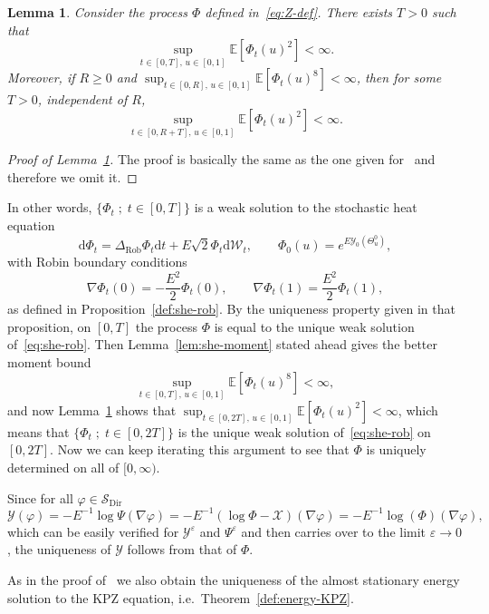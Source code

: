 \documentclass[10pt]{amsart}
\newtheorem{lemm}[theo]{Lemma}\newtheorem{prop}[theo]{Proposition}\newtheorem{coro}[theo]{Corollary}\newtheorem{conj}[theo]{Conjecture}
\theoremstyle{definition}\newtheorem{defi}[theo]{Definition}\newtheorem{rema}[theo]{Remark}\newtheorem{exam}[theo]{Example}\newtheorem{exem}[theo]{Example}\newtheorem{nota}[theo]{Notation}
\DeclareMathOperator{\Dir}{Dir}
\DeclareMathOperator{\Rob}{Rob}
\newcommand{\bb}[1]{{\mathbb #1}}
\newcommand{\mc}[1]{{\mathcal #1}}
\renewcommand{\mc}[1]{{\mathcal #1}}
\newcommand{\Ctwo}{\ensuremath{\mc S_{\Dir}}}
\renewcommand{\ge}{\geqslant}
\newcommand*{\dd}{\mathrm{d}}
\newcommand*{\dt}{\dd t}
\begin{document}
\begin{lemm}\label{lem:exp-int}
Consider the process $\Phi$ defined in~\eqref{eq:Z-def}. There exists $T>0$ such that
\[
\sup_{t \in [0,T], \, u\in [0,1]}\bb E[\Phi_t(u)^2] < \infty.
\]
Moreover, if $R\ge 0$ and $\sup_{t \in [0,R], \, u\in [0,1]} \bb E[\Phi_t(u)^{8}] < \infty$, then for some $T > 0$, independent of $R$,
\[
\sup_{t \in [0,R+T], \, u\in [0,1]} \bb E[\Phi_t(u)^{2}] < \infty.
\]
\end{lemm}

\begin{proof}[Proof of Lemma~\ref{lem:exp-int}]
The proof is basically the same as the one given for~\cite[Lemma~B.1]{Gubinelli2015Energy} and therefore we omit it.
\end{proof}

In other words, $\{\Phi_t \; ; \; t \in [0,T]\}$ is a weak solution to the stochastic heat equation
\[
\dd \Phi_t = \Delta_{\Rob} \Phi_t \dt + E \sqrt{2} \Phi_t \dd \mc W_t, \qquad \Phi_0 (u) = e^{E \mc Y_0 (\Theta^0_u)},
\]
with Robin boundary conditions
\[
\nabla \Phi_t(0) = - \frac{E^2}{2} \Phi_t(0), \qquad \nabla \Phi_t(1) = \frac{E^2}{2} \Phi_t(1),
\]
as defined in Proposition~\ref{def:she-rob}. By the uniqueness property given in that proposition, on $[0,T]$ the process $\Phi$ is equal to the unique weak solution of~\eqref{eq:she-rob}. Then Lemma~\ref{lem:she-moment} stated ahead gives the better moment bound
\[
\sup_{t \in [0,T], \, u \in [0,1]} \bb E[\Phi_t(u)^8] < \infty,
\]
and now Lemma~\ref{lem:exp-int} shows that $\sup_{t \in [0,2T], \, u \in [0,1]} \bb E[\Phi_t(u)^2] < \infty$, which means that $\{\Phi_t \; ; \; t \in [0,2T]\}$ is the unique weak solution of~\eqref{eq:she-rob} on $[0,2T]$. Now we can keep iterating this argument to see that $\Phi$ is uniquely determined on all of $[0,\infty)$.

Since for all $\varphi \in \Ctwo$
\begin{equation}\label{eq:lognabla}
\mc Y(\varphi) = - E^{-1} \log \Psi (\nabla \varphi) = - E^{- 1} (\log \Phi- \mc X)(\nabla \varphi) = - E^{- 1} \log (\Phi) (\nabla \varphi),
\end{equation}
which can be easily verified for $\mc Y^\varepsilon$ and $\Psi^\varepsilon$ and then carries over to the limit $\varepsilon \to 0$, the uniqueness of $\mc Y$ follows from that of $\Phi$.

As in the proof of~\cite[Theorem~2.10]{Gubinelli2015Energy} we also obtain the uniqueness of the almost stationary energy solution to the KPZ equation, i.e.~Theorem~\ref{def:energy-KPZ}.
\end{document}
